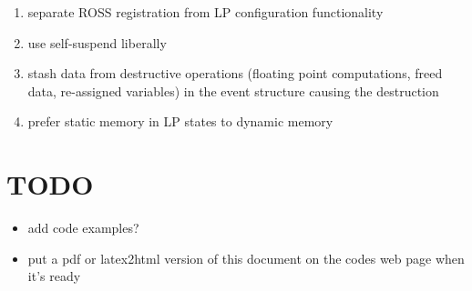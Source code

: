 \documentclass[conference,10pt,compsocconf,onecolumn]{IEEEtran}
\begin{document}
\begin{enumerate}
    \item separate ROSS registration from LP configuration functionality

    \item use self-suspend liberally
    \item stash data from destructive operations (floating point computations,
        freed data, re-assigned variables) in the event structure causing the
        destruction
    \item prefer static memory in LP states to dynamic memory

\end{enumerate}

\section{TODO}

\begin{itemize}
    \item add code examples?
    \item put a pdf or latex2html version of this document on the codes web page
        when it's ready
\end{itemize}

\begin{comment} ==== SCRATCH MATERIAL ====
\begin{figure}
\begin{lstlisting}[caption=Example code snippet., label=snippet-example]
for (i=0; i<n; i++) {
    for (j=0; j<i; j++) {
        /* do something */
    }
}
\end{lstlisting}
\end{figure}

Figure ~\ref{fig:snippet-example} shows an example of how to show a code
snippet in latex.  We can use this format as needed throughout the document.
\end{comment}
\end{document}
